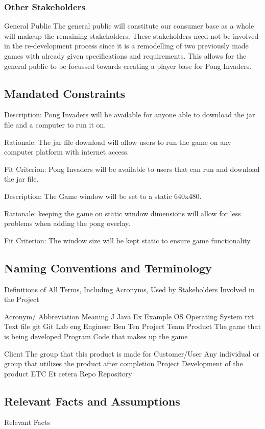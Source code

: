 \documentclass[12pt, titlepage]{article}
\begin{document}
\subsubsection{Other Stakeholders}
General Public
The general public will constitute our consumer base as a whole will makeup the remaining stakeholders. These stakeholders need not be involved in the re-development process since it is a remodelling of two previously made games with already given specifications and requirements. This allows for the general public to be focussed towards creating a player base for Pong Invaders. 
\subsection{Mandated Constraints}
Description: Pong Invaders will be available for anyone able to download the jar file and a computer to run it on.
 
Rationale: The jar file download will allow users to run the game on any computer platform with internet access.
 
Fit Criterion: Pong Invaders will be available to users that can run and download the jar file.
 

Description: The Game window will be set to a static 640x480.
 
Rationale: keeping the game on static window dimensions will allow for less problems when adding the pong overlay.
 
Fit Criterion: The window size will be kept static to ensure game functionality.

\subsection{Naming Conventions and Terminology}

Definitions of All Terms, Including Acronyms, Used by Stakeholders Involved in the Project


Acronym/ Abbreviation
Meaning
J
Java
Ex
Example
OS
Operating System
txt
Text file
git
Git Lab
eng
Engineer
Ben Ten
Project Team
Product
The game that is being developed
Program
Code that makes up the game

Client
The group that this product is made for
Customer/User
Any individual or group that utilizes the product after completion
Project
Development of the product
ETC
Et cetera
Repo
Repository

\subsection{Relevant Facts and Assumptions}
Relevant Facts
\end{document}
